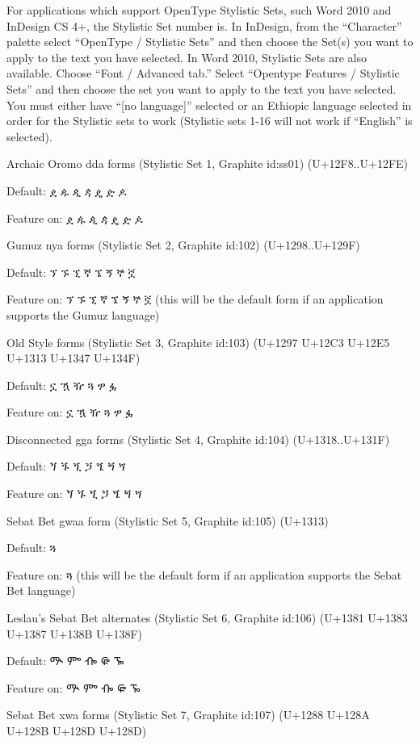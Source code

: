 \StylisticSet For applications which support OpenType Stylistic Sets, such Word 2010 and InDesign CS 4+, the Stylistic Set number is. In InDesign, from the “Character” palette select “OpenType / Stylistic Sets” and then choose the Set(s) you want to apply to the text you have selected. In Word 2010, Stylistic Sets are also available. Choose “Font / Advanced tab.” Select “Opentype Features / Stylistic Sets” and then choose the set you want to apply to the text you have selected. You must either have “[no language]” selected or an Ethiopic language selected in order for the Stylistic sets to work (Stylistic sets 1-16 will not work if “English” is selected).


\StylisticSet Archaic Oromo dda forms (Stylistic Set 1, Graphite id:ss01) (U+12F8..U+12FE)

\IndSS Default:	ዸ ዹ ዺ ዻ ዼ ዽ ዾ

\Oromo Feature on:	ዸ ዹ ዺ ዻ ዼ ዽ ዾ


\StylisticSet Gumuz nya forms (Stylistic Set 2, Graphite id:102) (U+1298..U+129F)

\IndSS Default:		ኘ ኙ ኚ ኛ ኜ ኝ ኞ ኟ

\IndSS\Gumuz Feature on:	ኘ ኙ ኚ ኛ ኜ ኝ ኞ ኟ (this will be the default form if an application supports the Gumuz language)


\StylisticSet Old Style forms (Stylistic Set 3, Graphite id:103) (U+1297 U+12C3 U+12E5 U+1313 U+1347 U+134F)

\IndSS Default:		ኗ ዃ ዥ ጓ ፇ ፏ  

\IndSS\OldStyle Feature on:	ኗ ዃ ዥ ጓ ፇ ፏ  


\StylisticSet Disconnected gga forms (Stylistic Set 4, Graphite id:104) (U+1318..U+131F)

\IndSS Default:		ጘ ጙ ጚ ጛ ጜ ጝ ጞ  

\IndSS\Disconnected Feature on:	ጘ ጙ ጚ ጛ ጜ ጝ ጞ


\StylisticSet Sebat Bet gwaa form (Stylistic Set 5, Graphite id:105) (U+1313)

\IndSS Default:		ጓ  

\IndSS\SBDef Feature on:	ጓ (this will be the default form if an application supports the Sebat Bet language)


\StylisticSet Leslau’s Sebat Bet alternates (Stylistic Set 6, Graphite id:106) (U+1381 U+1383 U+1387 U+138B U+138F)

\IndSS Default:		ᎁ ᎃ ᎇ ᎋ ᎏ

\IndSS\Leslau Feature on:	ᎁ ᎃ ᎇ ᎋ ᎏ 

\StylisticSet Sebat Bet xwa forms (Stylistic Set 7, Graphite id:107) (U+1288 U+128A U+128B U+128D U+128D)

